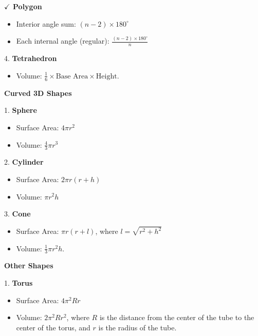\textbf{$\checkmark$ Polygon}

\begin{itemize}
  \item Interior angle sum:
  $(n-2) \times 180^{\circ}$

  \item Each internal angle (regular):
  $\frac{(n-2)\times180^{\circ}}{n}$
\end{itemize}

4. \textbf{Tetrahedron}
\begin{itemize}
  \item Volume: $\frac{1}{6} \times \text{Base Area} \times \text{Height}$.
\end{itemize}

\textbf{Curved 3D Shapes}

1. \textbf{Sphere}
\begin{itemize}
  \item Surface Area: $4\pi r^2$
  \item Volume: $\frac{4}{3}\pi r^3$
\end{itemize}
2. \textbf{Cylinder}
\begin{itemize}
  \item Surface Area: $2\pi r(r+h)$
  \item Volume: $\pi r^2 h$
\end{itemize}
3. \textbf{Cone}
\begin{itemize}
  \item Surface Area: $\pi r(r+l)$, where $l=\sqrt{r^2+h^2}$
  \item Volume: $\frac{1}{3}\pi r^2 h$.
\end{itemize}

\textbf{Other Shapes}

1. \textbf{Torus}
\begin{itemize}
  \item Surface Area: $4\pi^2 Rr$
  \item Volume: $2\pi^2 Rr^2$, where $R$ is the distance from the center of the tube to the center of the torus, and $r$ is the radius of the tube.
\end{itemize}
